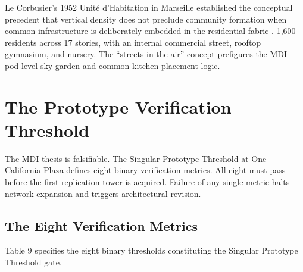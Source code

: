 \documentclass[12pt, letterpaper]{article}
\begin{document}
Le Corbusier's 1952 Unit\'{e} d'Habitation in Marseille established the conceptual precedent that vertical density does not preclude community formation when common infrastructure is deliberately embedded in the residential fabric \citep{le_corbusier_1952}. 1,600 residents across 17 stories, with an internal commercial street, rooftop gymnasium, and nursery. The ``streets in the air'' concept prefigures the MDI pod-level sky garden and common kitchen placement logic.

\clearpage
\section{The Prototype Verification Threshold}

The MDI thesis is falsifiable. The Singular Prototype Threshold at One California Plaza defines eight binary verification metrics. All eight must pass before the first replication tower is acquired. Failure of any single metric halts network expansion and triggers architectural revision.

\subsection{The Eight Verification Metrics}

Table 9 specifies the eight binary thresholds constituting the Singular Prototype Threshold gate.
\end{document}
